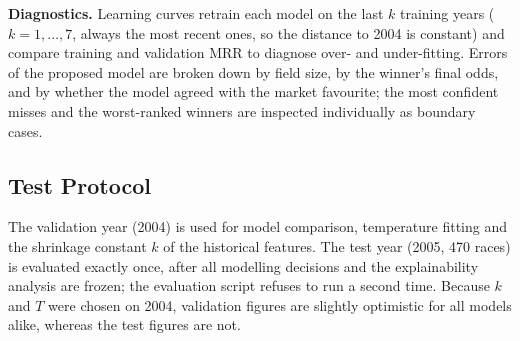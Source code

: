 \textbf{Diagnostics.} Learning curves retrain each model on the last $k$
training years ($k=1,\dots,7$, always the most recent ones, so the distance to
2004 is constant) and compare training and validation MRR to diagnose
over- and under-fitting. Errors of the proposed model are broken down by field
size, by the winner's final odds, and by whether the model agreed with the
market favourite; the most confident misses and the worst-ranked winners are
inspected individually as boundary cases.

\subsection{Test Protocol}

The validation year (2004) is used for model comparison, temperature fitting
and the shrinkage constant $k$ of the historical features. The test year
(2005, 470 races) is evaluated exactly once, after all modelling decisions and
the explainability analysis are frozen; the evaluation script refuses to run a
second time. Because $k$ and $T$ were chosen on 2004, validation figures are
slightly optimistic for all models alike, whereas the test figures are not.

